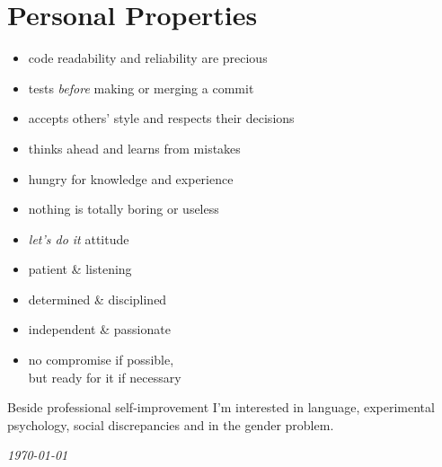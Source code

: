 \documentclass[a4paper,12pt]{article}
\newcommand\Yell{\textbf}
\newcommand\Label{\textsf}
\newcommand{\compress}{\setlength\itemsep{-\parskip}}
\newcommand{\midline}{\rule[0.5ex]{\linewidth-\parindent}{.5pt}}
\newenvironment{compressedItemize}{\begin{itemize}\compress}{\end{itemize}}
\begin{document}
%

\section{Personal Properties}

\begin{multicols}{2}
\begin{compressedItemize}
\item	code readability and reliability are precious
\item	tests \textit{before} making or merging a commit
\item	accepts others' style and respects their decisions
\item	thinks ahead and learns from mistakes
\item	hungry for knowledge and experience
\item	nothing is totally boring or useless
\columnbreak
\item	\textit{let's do it} attitude
\item	patient \& listening
\item	determined \& disciplined
\item	independent \& passionate
\item	no compromise if possible, \\ but ready for it if necessary
\end{compressedItemize}
\end{multicols}

\medskip

Beside professional self-improvement I'm interested in language, experimental
psychology, social discrepancies and in the gender problem.

\center\itshape\today
\end{document}
